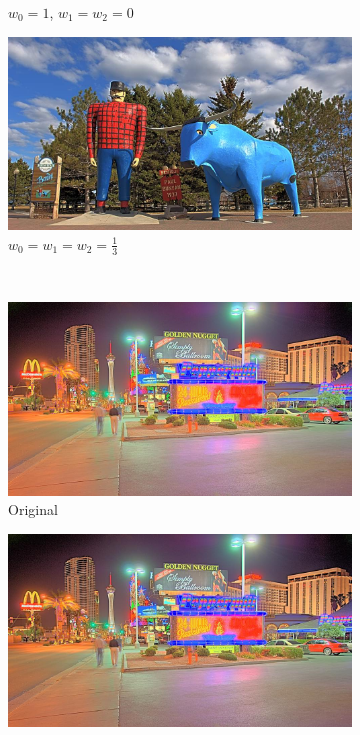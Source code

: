\begin{landscape}
\begin{figure}
\begin{subfigure}[b]{0.40\textwidth}
    \caption{$w_0 = 1$, $w_1 = w_2 = 0$}
    \label{FigStyle:VerIIa_paul_bunyan}
\end{subfigure}\hfill
\begin{subfigure}[b]{0.40\textwidth}
   \centering
    \includegraphics[width=\textwidth]{figures/chapter5/style_based/PaulBunyan_hdrcandy_w0_w1_w2_small.jpg}
    \caption{$w_0 = w_1 = w_2 = \frac{1}{3}$}
    \label{FigStyle:VerIIb_paul_bunyan}
\end{subfigure}\\
\begin{subfigure}[b]{0.40\textwidth}
    \centering
    \includegraphics[width=\textwidth]{figures/chapter5/style_based/Peppermill_hdrcandy_v1_small.jpg}
    \caption{Original}
    \label{FigStyle:original_peppermill}
\end{subfigure}\hfill
\begin{subfigure}[b]{0.40\textwidth}
    \centering
    \includegraphics[width=\textwidth]{figures/chapter5/style_based/Peppermill_hdrcandy_v2_small.jpg}

\end{subfigure}
\end{figure}
\end{landscape}
